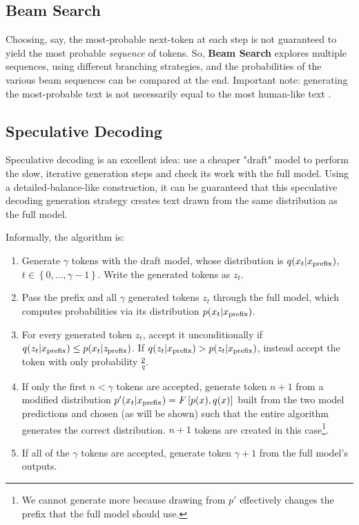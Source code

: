 \subsection{Beam Search \label{subsec_beam_search}}

Choosing, say, the most-probable next-token at each step is not guaranteed to yield the most
probable \textit{sequence} of tokens. So, \textbf{Beam Search} explores multiple sequences, using
different branching strategies, and the probabilities of the various beam sequences can be compared
at the end. Important note: generating the most-probable text is not necessarily equal to the most
human-like text \cite{holtzman2020curious}.



\subsection{Speculative Decoding \label{subsec_speculative_decoding}}

Speculative decoding \cite{leviathan2023fastinferencetransformersspeculative} is an excellent idea:
use a cheaper "draft" model to perform the slow, iterative generation steps and check its work with
the full model. Using a detailed-balance-like construction, it can be guaranteed that this
speculative decoding generation strategy creates text drawn from the same distribution as the full
model.

Informally, the algorithm is:
\begin{enumerate}
    \item Generate $ \gamma  $ tokens with the draft model, whose distribution is $ q(x _{ t }|x _{
        {\rm  prefix} }) $, $ t \in \left \{ 0, \ldots , \gamma -1 \right \} $. Write the generated
        tokens as $ z _{ t } $.
    \item Pass the prefix and all $ \gamma  $ generated tokens $ z _{ t } $ through the full model,
        which computes probabilities via its distribution $ p(x _{ t }|x _{ {\rm  prefix} }) $.
    \item For every generated token $ z _{ t } $, accept it
        unconditionally if $ q(z_t| x _{ {\rm  prefix} })\le p(x_t| z _{ {\rm  prefix} })  $. If $
         q(z_t| x _{ {\rm  prefix} }) > p(z_t| x _{ {\rm  prefix} })$, instead accept the token
        with only probability $ \frac{ p }{ q } $.
    \item If only the first $ n < \gamma  $ tokens are accepted, generate token $ n+1 $ from a
        modified distribution $ p'(x_t| x _{ {\rm prefix} }) = F \left [ p(x), q(x) \right ]$ built
        from the two model predictions and chosen (as will be shown) such that the entire algorithm
        generates the correct distribution. $ n+1 $ tokens are created in this case\footnote{We
        cannot generate more because drawing from $ p' $ effectively changes the prefix that the
        full model should use.}.
    \item If all of the $ \gamma  $ tokens are accepted, generate token $ \gamma +1 $ from the full
        model's outputs.
\end{enumerate}

